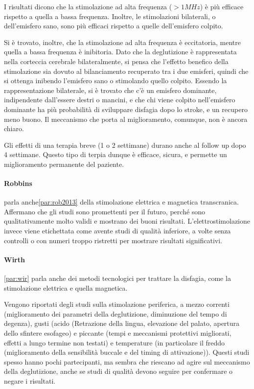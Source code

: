 I risultati dicono che la stimolazione ad alta frequenza ($>1MHz$) è più 
efficace rispetto a quella a bassa frequenza.
Inoltre, le stimolazioni bilaterali, o dell'emisfero sano, sono più efficaci 
rispetto a quelle dell'emisfero colpito.

Si è trovato, inoltre, che la stimolazione ad alta frequenza è eccitatoria, 
mentre quella a bassa frequenza è inibitoria.
Dato che la deglutizione è rappresentata nella corteccia cerebrale 
bilateralmente, si pensa che l'effetto benefico della stimolazione sia dovuto 
al bilanciamento recuperato tra i due emisferi, quindi che si ottenga inibendo 
l'emisfero sano o stimolando quello colpito.
Essendo la rappresentazione bilaterale, si è trovato che c'è un emisfero 
dominante, indipendente dall'essere destri o mancini, e che chi viene colpito 
nell'emisfero dominante ha più probabilità di sviluppare disfagia dopo lo 
stroke, e un recupero meno buono.
Il meccanismo che porta al miglioramento, comunque, non è ancora chiaro.

Gli effetti di una terapia breve (1 o 2 settimane) durano anche al follow up 
dopo 4 settimane.
Questo tipo di terpia dunque è efficace, sicura, e permette un miglioramento 
permanente del paziente.

\paragraph{Robbins}\cite{Robbins2013} parla anche\ref{par:rob2013} della 
stimolazione elettrica e magnetica transcranica.
Affermano che gli studi sono promettenti per il futuro, perché sono 
qualitativamente molto validi e mostrano dei buoni risultati.
L'elettrostimolazione invece viene etichettata come avente studi di qualità 
inferiore, a volte senza controlli o con numeri troppo ristretti per mostrare 
risultati significativi.

\paragraph{Wirth}\ref{par:wir} parla anche dei metodi tecnologici per trattare 
la disfagia, come la stimolazione elettrica e quella magnetica.

Vengono riportati degli studi sulla stimolazione periferica, a mezzo correnti 
(miglioramento dei parametri della deglutizione, diminuzione del tempo di 
degenza), gusti (acido (Retrazione della lingua, elevazione del palato, 
apertura dello sfintere esofageo) e piccante (tempi e meccanismi protettivi 
migliorati, effetti a lungo termine non testati) e temperature (in particolare 
il freddo (miglioramento della sensibilità buccale e del timing di 
attivazione)).
Questi studi spesso hanno pochi partecipanti, ma sembra che riescano ad agire 
sul meccanismo della deglutizione, anche se studi di qualità devono seguire per 
confermare o negare i risultati.

